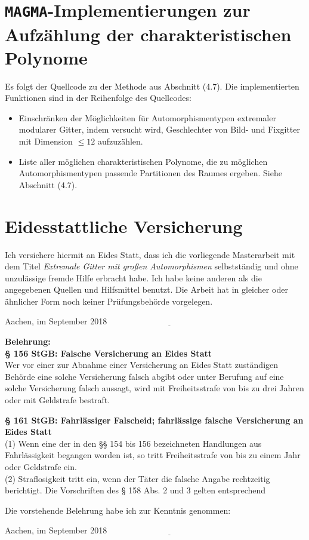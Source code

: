 \documentclass[12pt,a4paper,halfparskip,headsepline,bibtotocnumbered]{scrreprt}
\theoremstyle{nummermitklammern}
\theoremstyle{nonumberbreak}
\begin{document}
\section{\texttt{MAGMA}-Implementierungen zur Aufzählung der charakteristischen Polynome}
Es folgt der Quellcode zu der Methode aus Abschnitt (4.7). Die implementierten Funktionen sind in der Reihenfolge des Quellcodes:
\begin{itemize}
	\item Einschränken der Möglichkeiten für Automorphismentypen extremaler modularer Gitter, indem versucht wird, Geschlechter von Bild- und Fixgitter mit Dimension $\leq 12$ aufzuzählen.
	\item Liste aller möglichen charakteristischen Polynome, die zu möglichen Automorphismentypen passende Partitionen des Raumes ergeben. Siehe Abschnitt (4.7).
\end{itemize}


\newpage
\section{Eidesstattliche Versicherung}
Ich versichere hiermit an Eides Statt, dass ich die vorliegende Masterarbeit mit dem Titel
\textit{Extremale Gitter mit großen Automorphismen} selbstständig und ohne unzulässige fremde Hilfe erbracht habe.
Ich habe keine anderen als die angegebenen Quellen und Hilfsmittel benutzt. Die Arbeit hat in gleicher oder
ähnlicher Form noch keiner Prüfungsbehörde vorgelegen.\par
\vspace{0.5cm}
Aachen, im September 2018 \hfill $\underline{\hspace{6cm}}$\par
\vspace{2cm}
\begin{small}
\textbf{Belehrung:}\\
\textbf{§ 156 StGB: Falsche Versicherung an Eides Statt}\\
Wer vor einer zur Abnahme einer Versicherung an Eides Statt zuständigen Behörde eine solche Versicherung
falsch abgibt oder unter Berufung auf eine solche Versicherung falsch aussagt, wird mit Freiheitsstrafe
von bis zu drei Jahren oder mit Geldstrafe bestraft.\par
\textbf{§ 161 StGB: Fahrlässiger Falscheid; fahrlässige falsche Versicherung an Eides Statt}\\
(1) Wenn eine der in den §§ 154 bis 156 bezeichneten Handlungen aus Fahrlässigkeit begangen worden ist, so
tritt Freiheitsstrafe von bis zu einem Jahr oder Geldstrafe ein.\\
(2) Straflosigkeit tritt ein, wenn der Täter die falsche Angabe rechtzeitig berichtigt. Die
Vorschriften des § 158 Abs. 2 und 3 gelten entsprechend\par
\end{small}
Die vorstehende Belehrung habe ich zur Kenntnis genommen:\par
\vspace{0.5cm}
Aachen, im September 2018 \hfill $\underline{\hspace{6cm}}$\\

\newpage

\end{document}
